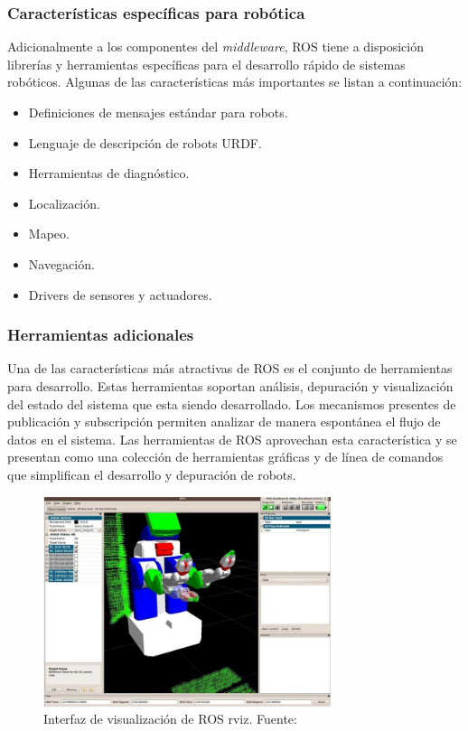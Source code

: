         \subsubsection{Características específicas para robótica}
        Adicionalmente a los componentes del \textit{middleware}, ROS tiene a disposición librerías y herramientas específicas 
        para el desarrollo rápido de sistemas robóticos. Algunas de las características más importantes se listan a continuación:

        \begin{itemize}
            \item Definiciones de mensajes estándar para robots.
            \item Lenguaje de descripción de robots URDF.
            \item Herramientas de diagnóstico.
            \item Localización.
            \item Mapeo.
            \item Navegación.
            \item Drivers de sensores y actuadores.
        \end{itemize}

        \subsubsection{Herramientas adicionales}
        Una de las características más atractivas de ROS es el conjunto de herramientas para desarrollo. Estas herramientas 
        soportan análisis, depuración y visualización del estado del sistema que esta siendo desarrollado. Los mecanismos presentes
        de publicación y subscripción permiten analizar de manera espontánea el flujo de datos en el sistema. Las herramientas 
        de ROS aprovechan esta característica y se presentan como una colección de herramientas gráficas y de línea de comandos que 
        simplifican el desarrollo y depuración de robots.

        \begin{figure}[!h] 
            \centering
            \includegraphics[width=0.75\textwidth]{img/rviz}
            \caption{Interfaz de visualización de ROS rviz. Fuente: \cite{roswiki} }
            \label{fig:rviz}
        \end{figure}

